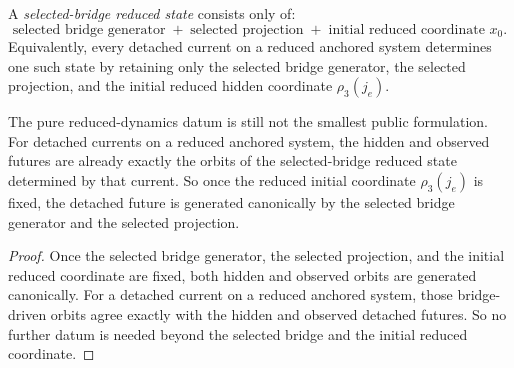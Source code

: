 \begin{definition}
\label{def:selected-bridge-reduced-state}
A \emph{selected-bridge reduced state} consists only of:
\[
\text{selected bridge generator}
\;+\;
\text{selected projection}
\;+\;
\text{initial reduced coordinate }x_0.
\]
Equivalently, every detached current on a reduced anchored system determines
one such state by retaining only the selected bridge generator, the selected
projection, and the initial reduced hidden coordinate \(\rho_3(j_e)\).
\end{definition}

\begin{corollary}
\label{thm:once-rho3-is-fixed-the-detached-future-is-generated-by-the-selected-bridge}
The pure reduced-dynamics datum is still not the smallest public
formulation. For detached currents on a reduced anchored system, the hidden and
observed futures are already exactly the orbits of the selected-bridge reduced
state determined by that current. So once the reduced initial coordinate
\(\rho_3(j_e)\) is fixed, the detached future is generated canonically by the
selected bridge generator and the selected projection.
\end{corollary}

\begin{proof}
Once the selected bridge generator, the selected projection, and the initial
reduced coordinate are fixed, both hidden and observed orbits are generated
canonically. For a detached current on a reduced anchored system, those
bridge-driven orbits agree exactly with the hidden and observed detached
futures. So no further datum is needed beyond the selected bridge and the
initial reduced coordinate.
\end{proof}

